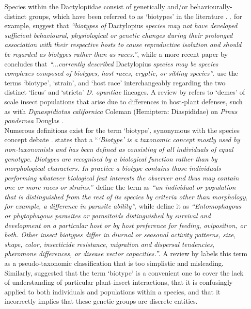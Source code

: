 Species within the Dactylopiidae consist of genetically and/or behaviourally-distinct groups, which have been referred to as `biotypes' in the literature \citep{githure1999host, Volchansky1999, Hoffmann2004a, Mathenge2009, Mathenge2010a, Mathenge2010, Jones2015, Mathenge2015}. \citet{Mathenge2010}, for example, suggest that \textit{``biotypes of} Dactylopius \textit{species may not have developed sufficient behavioural, physiological or genetic changes during their prolonged association with their respective hosts to cause reproductive isolation and should be regarded as biotypes rather than as races.''}, while a more recent paper by \citet{Mathenge2015} concludes that \textit{``...currently described} Dactylopius \textit{species may be species complexes composed of biotypes, host races, cryptic, or sibling species''}. \citet{Volchansky1999} use the terms `biotype', `strain', and `host race' interchangeably regarding the two distinct `ficus' and `stricta' \textit{D. opuntiae} lineages. 
A review by \citet{miller1979recent} refers to `demes' of scale insect populations that arise due to differences in host-plant defenses, such as with \textit{Dynaspidiotus californica} Coleman (Hemiptera: Diaspididae) on \textit{Pinus ponderosa} Douglas \citep{edmunds1978coevolution}. \\
Numerous definitions exist for the term `biotype', synonymous with the species concept debate \citep{hauser1987debate}. \citet{eastop1973aphidbioytpes} states that a ``\textit{`Biotype' is a taxonomic concept mostly used by non-taxonomists and has been defined as consisting of all individuals of equal genotype. Biotypes are recognised by a biological function rather than by morphological characters. In practice a biotype contains those individuals performing whatever biological feat interests the observer and thus may contain one or more races or strains.}''
\citet{maxwell1980breeding} define the term as \textit{``an individual or population that is distinguished from the rest of its species by criteria other than morphology, for example, a difference in parasite ability''}, while \citet{Diehl1984AnBiotypes} define it as \textit{``Entomophagous or phytophagous parasites or parasitoids distinguished by survival and development on a particular host or by host preference for feeding, oviposition, or both. Other insect biotypes differ in diurnal or seasonal activity patterns, size, shape, color, insecticide resistance, migration and dispersal tendencies, pheromone differences, or disease vector capacities.''}. A review by \citet{Downie2010} labels this term as a pseudo-taxonomic classification that is too simplistic and misleading. Similarly, \citet{Claridge1983TheAgriculture} suggested that the term `biotype' is a convenient one to cover the lack of understanding of particular plant-insect interactions, that it is confusingly applied to both individuals and populations within a species, and that it incorrectly implies that these genetic groups are discrete entities.
